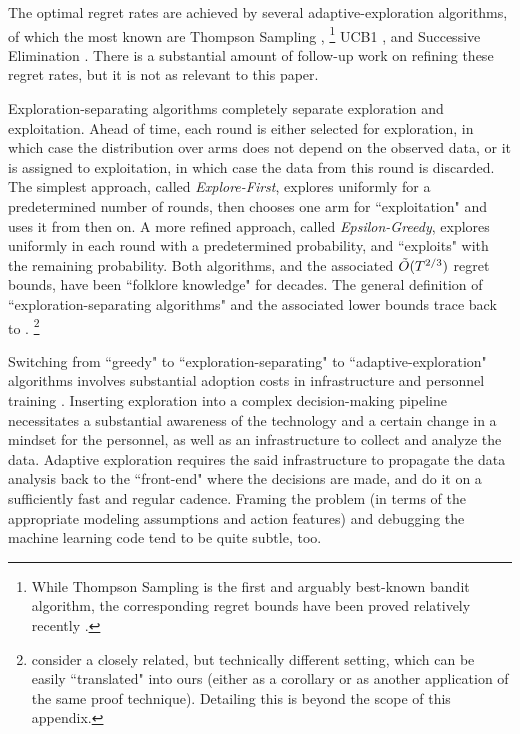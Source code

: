 The optimal regret rates are achieved by several adaptive-exploration  algorithms, of which the most known are
Thompson Sampling \citep{Thompson-1933,TS-survey-FTML18},%
\footnote{While Thompson Sampling is the first and arguably best-known bandit algorithm, the corresponding regret bounds have been proved relatively recently \citep{Shipra-colt12,Kaufmann-alt12,Shipra-aistats13}.}
UCB1 \citep{bandits-ucb1},
and Successive Elimination \citep{EvenDar-icml06}. There is a substantial amount of follow-up work on refining these regret rates, but it is not as relevant to this paper.

Exploration-separating algorithms completely separate exploration and exploitation. Ahead of time, each round is either selected for exploration, in which case  the distribution over arms does not depend on the observed data, or it is assigned to exploitation, in which case the data from this round is discarded. The simplest approach, called \emph{Explore-First}, explores uniformly for a predetermined number of rounds, then chooses one arm for ``exploitation" and uses it from then on. A more refined approach, called \emph{Epsilon-Greedy}, explores uniformly in each round with a predetermined probability, and ``exploits" with the remaining probability. Both algorithms, and the associated $\tilde{O}(T^{2/3})$ regret bounds, have been ``folklore knowledge" for decades. The general definition of ``exploration-separating algorithms" and the associated lower bounds trace back to \citet{MechMAB-ec09}.%
\footnote{\citet{MechMAB-ec09} consider a closely related, but technically different setting, which can be easily ``translated" into ours (either as a corollary or as another application of the same proof technique). Detailing this is beyond the scope of this appendix.}


Switching from ``greedy" to ``exploration-separating" to ``adaptive-exploration" algorithms involves substantial adoption costs in infrastructure and personnel training \citep{DS-arxiv}. Inserting exploration into a complex decision-making pipeline necessitates a substantial awareness of the technology and a certain change in a mindset for the personnel, as well as an infrastructure to collect and analyze the data. Adaptive exploration requires the said infrastructure to propagate the data analysis back to the ``front-end" where the decisions are made, and do it on a sufficiently fast and regular cadence. Framing the problem (in terms of the appropriate modeling assumptions and action features) and debugging the machine learning code tend to be quite subtle, too.

